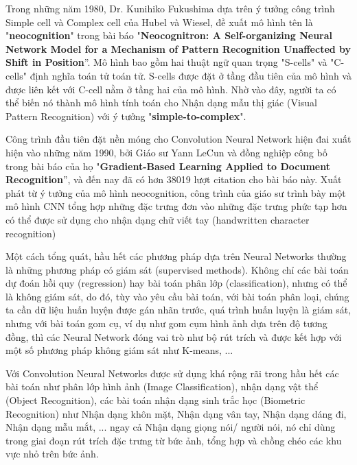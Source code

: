 \documentclass{article}
\begin{document}
	Trong những năm 1980, Dr. Kunihiko Fukushima dựa trên ý tưởng công trình Simple cell và Complex cell của Hubel và Wiesel, đề xuất mô hình tên là "\textbf{neocognition}" trong bài báo "\textbf{Neocognitron: A Self-organizing Neural Network Model for a Mechanism of Pattern Recognition Unaffected by Shift in Position}”. Mô hình bao gồm hai thuật ngữ quan trọng "S-cells" và "C-cells" định nghĩa toán tử toán tử. S-cells được đặt ở tầng đầu tiên của mô hình và được liên kết với C-cell nằm ở tầng hai của mô hình. Nhờ vào đây, người ta có thể biến nó thành mô hình tính toán cho Nhận dạng mẫu thị giác (Visual Pattern Recognition) với ý tưởng "\textbf{simple-to-complex}".
	
	Công trình đầu tiên đặt nền móng cho Convolution Neural Network hiện đai xuất hiện vào những năm 1990, bởi Giáo sư Yann LeCun và đồng nghiệp công bố trong bài báo của họ "\textbf{Gradient-Based Learning Applied to Document Recognition}”, và đến nay đã có hơn 38019 lượt citation cho bài báo này. Xuất phát từ ý tưởng của mô hình neocognition, công trình của giáo sư trình bày một mô hình CNN tổng hợp những đặc trưng đơn vào những đặc trưng phức tạp hơn có thể được sử dụng cho nhận dạng chữ viết tay (handwritten character recognition)
	
	Một cách tổng quát, hầu hết các phương pháp dựa trên Neural Networks thường là những phương pháp có giám sát (supervised methods). Không chỉ các bài toán dự đoán hồi quy (regression) hay bài toán phân lớp (classification), nhưng có thể là không giám sát, do đó, tùy vào yêu cầu bài toán, với bài toán phân loại, chúng ta cần dữ liệu huấn luyện được gán nhãn trước, quá trình huấn luyện là giám sát, nhưng với bài toán gom cụ, ví dụ như gom cụm hình ảnh dựa trên độ tương đồng, thì các Neural Network đóng vai trò như bộ rút trích và được kết hợp với một số phương pháp không giám sát như K-means, ... 
	
	Với Convolution Neural Networks được sử dụng khá rộng rãi trong hầu hết các bài toán như phân lớp hình ảnh (Image Classification), nhận dạng vật thể (Object Recognition), các bài toán nhận dạng sinh trắc học (Biometric Recognition) như Nhận dạng khôn mặt, Nhận dạng vân tay, Nhận dạng dáng đi, Nhận dạng mẫu mắt, ... ngay cả Nhận dạng giọng nói/ người nói, nó chỉ dùng trong giai đoạn rút trích đặc trưng từ bức ảnh, tổng hợp và chồng chéo các khu vực nhỏ trên bức ảnh.
\end{document}
